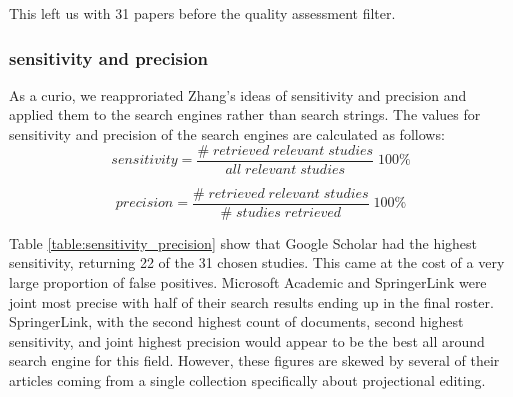 This left us with 31 papers before the quality assessment filter.

\subsubsection{sensitivity and precision}
As a curio, we reapproriated Zhang's\cite{Zhang_2011} ideas of sensitivity and precision and applied them to the search engines rather than search strings.
The values for sensitivity and precision of the search engines are calculated as follows:
\[
        sensitivity = \frac{\#\;retrieved\;relevant\;studies}{all\;relevant\;studies} \;100\%
\]

\[
        precision = \frac{\#\;retrieved\;relevant\;studies}{\#\;studies\;retrieved} \;100\%
\]

Table \ref{table:sensitivity_precision} show that Google Scholar had the highest sensitivity, returning 22 of the 31 chosen studies.
This came at the cost of a very large proportion of false positives.
Microsoft Academic and SpringerLink were joint most precise with half of their search results ending up in the final roster.
SpringerLink, with the second highest count of documents, second highest sensitivity, and joint highest precision would appear to be the best all around search engine for this field.
However, these figures are skewed by several of their articles coming from a single collection specifically about projectional editing.

